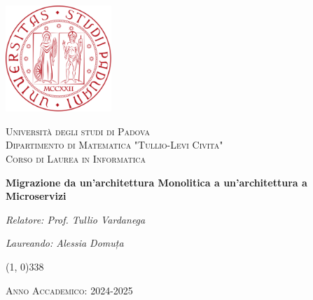 \begin{titlepage}
    \begin{center}
        \includegraphics[width=0.3\textwidth]{BCS-Tessi/images/unipd_logo.png}\par\vspace{1cm}  %
        \textsc{\LARGE Università degli studi di Padova}\\[1.5cm]  %
        \textsc{\Large Dipartimento di Matematica "Tullio-Levi Civita"}\\[0.5cm]  %
        \textsc{\large Corso di Laurea in Informatica}\\[0.5cm]  %

        \vspace{10pt}

        \vspace{100pt}

        \begin{LARGE}
            \textbf{Migrazione da un'architettura Monolitica a un'architettura a Microservizi}\\
        \end{LARGE}

        \vspace{200pt}
        \begin{minipage}[t]{0.45\textwidth}
        
            \begin{flushleft}
                \textit{Relatore: Prof. Tullio Vardanega }\\
            \end{flushleft}
        \end{minipage}%
        \hfill
        \begin{minipage}[t]{0.45\textwidth}
            \begin{flushright}
                \textit{Laureando: Alessia Domuța}\\
            \end{flushright}
        \end{minipage}

        \vfill
        \vspace{30pt}
        \line(1, 0){338} \\
        \begin{normalsize}
            \textsc{Anno Accademico: 2024-2025}
        \end{normalsize}
    \end{center}
\end{titlepage}
